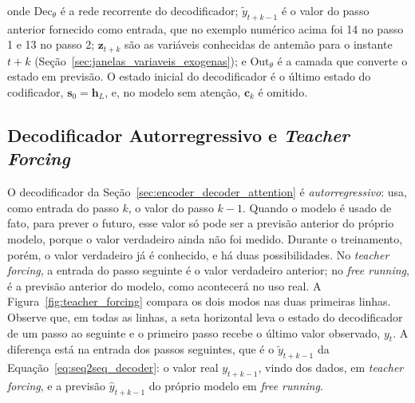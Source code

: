 \noindent onde \(\mathrm{Dec}_{\theta}\) é a rede recorrente do decodificador; \(\tilde{y}_{t+k-1}\) é o valor do passo anterior fornecido como entrada, que no exemplo numérico acima foi 14 no passo 1 e 13 no passo 2; \(\mathbf{z}_{t+k}\) são as variáveis conhecidas de antemão para o instante \(t+k\) (Seção~\ref{sec:janelas_variaveis_exogenas}); e \(\mathrm{Out}_{\theta}\) é a camada que converte o estado em previsão. O estado inicial do decodificador é o último estado do codificador, \(\mathbf{s}_0=\mathbf{h}_L\), e, no modelo sem atenção, \(\mathbf{c}_k\) é omitido.

\subsection{Decodificador Autorregressivo e \textit{Teacher Forcing}}
\label{sec:teacher_forcing}

O decodificador da Seção~\ref{sec:encoder_decoder_attention} é \emph{autorregressivo}: usa, como entrada do passo \(k\), o valor do passo \(k-1\). Quando o modelo é usado de fato, para prever o futuro, esse valor só pode ser a previsão anterior do próprio modelo, porque o valor verdadeiro ainda não foi medido. Durante o treinamento, porém, o valor verdadeiro já é conhecido, e há duas possibilidades. No \textit{teacher forcing}, a entrada do passo seguinte é o valor verdadeiro anterior; no \textit{free running}, é a previsão anterior do modelo, como acontecerá no uso real. A Figura~\ref{fig:teacher_forcing} compara os dois modos nas duas primeiras linhas. Observe que, em todas as linhas, a seta horizontal leva o estado do decodificador de um passo ao seguinte e o primeiro passo recebe o último valor observado, \(y_t\). A diferença está na entrada dos passos seguintes, que é o \(\tilde{y}_{t+k-1}\) da Equação~\ref{eq:seq2seq_decoder}: o valor real \(y_{t+k-1}\), vindo dos dados, em \textit{teacher forcing}, e a previsão \(\hat{y}_{t+k-1}\) do próprio modelo em \textit{free running}.

